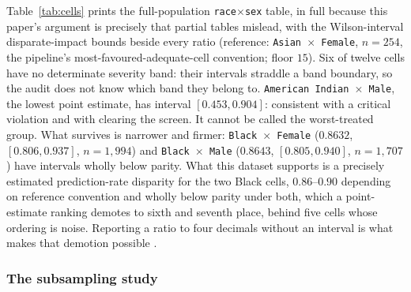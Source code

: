 \documentclass[sigconf,nonacm]{acmart}
\begin{document}
Table~\ref{tab:cells} prints the full-population
\texttt{race}$\times$\texttt{sex} table, in full because this paper's
argument is precisely that partial tables mislead, with the Wilson-interval
disparate-impact bounds beside every ratio (reference: \texttt{Asian $\times$
Female}, $n{=}254$, the pipeline's most-favoured-adequate-cell convention;
floor $15$). Six of twelve cells have no determinate severity band: their
intervals straddle a band boundary, so the audit does not know which band they
belong to. \texttt{American Indian $\times$ Male}, the lowest point estimate,
has interval $[0.453, 0.904]$: consistent with a critical violation and
with clearing the screen. It cannot be called the worst-treated group. What
survives is narrower and firmer: \texttt{Black $\times$ Female} ($0.8632$,
$[0.806, 0.937]$, $n{=}1{,}994$) and \texttt{Black $\times$ Male} ($0.8643$,
$[0.805, 0.940]$, $n{=}1{,}707$) have intervals wholly below parity. What
this dataset supports is a precisely estimated prediction-rate disparity for
the two Black cells, $0.86$--$0.90$ depending on reference convention and
wholly below parity under both, which a point-estimate ranking
demotes to sixth and seventh place, behind five cells whose ordering is noise.
Reporting a ratio to four decimals without an interval is what makes that
demotion possible \citep{chen2018}.

\begin{table}[t]
\caption{HMDA \texttt{race}$\times$\texttt{sex}, full population
($10{,}978$), out-of-fold predictions. Reference \texttt{Asian $\times$
Female} ($n{=}254$); conservative Wilson-based DI intervals; ``band det.''
marks cells whose whole interval sits in one severity band. Generated by
\texttt{scripts/interval\_estimates.py}; appendix~\ref{app:cells} repeats this
table under two further reference conventions.}
\label{tab:cells}
\footnotesize

\end{table}

\subsubsection{The subsampling study}
\label{sec:subsample}
\end{document}
